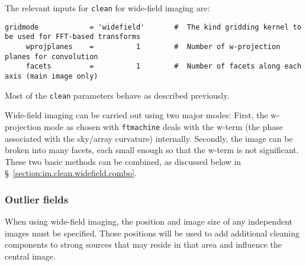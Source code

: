 %
%

The relevant inputs for {\tt clean} for wide-field imaging are:
\small
\begin{verbatim}
gridmode            = 'widefield'       #  The kind gridding kernel to be used for FFT-based transforms
     wprojplanes    =          1        #  Number of w-projection planes for convolution
     facets         =          1        #  Number of facets along each axis (main image only)
\end{verbatim}
\normalsize
Most of the {\tt clean} parameters behave as described previously.

Wide-field imaging can be carried out using two major modes: First, the
w-projection mode as chosen with {\tt ftmachine} deals with the w-term
(the phase associated with the sky/array curvature) internally.  Secondly, the image can be
broken into many facets, each small enough so that the w-term is not
significant.  These two basic methods can be combined, as discussed
below in \S~\ref{section:im.clean.widefield.combo}.

\subsubsection{Outlier fields}
\label{section:im.clean.widefield.outliers}

When using wide-field imaging, the position and image size of any
independent images must be specified. Those positions will be used to
add additional cleaning components to strong sources that may reside
in that area and influence the central image.

